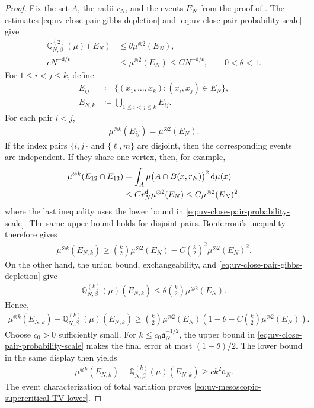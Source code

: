 \documentclass[11pt,reqno]{amsart}
\numberwithin{equation}{section}
\theoremstyle{plain}
\theoremstyle{remark}
\renewcommand{\d}{\mathsf{d}}
\newcommand{\md}{\mathrm{d}}
\newcommand{\Q}{{\mathbb{Q}}}
\newcommand{\be}{\beta}
\newcommand{\s}{\mathsf{s}}
\begin{document}
\begin{proof}
Fix the set \(A\), the radii \(r_N\), and the events \(E_N\) from the proof of .  The estimates \eqref{eq:uv-close-pair-gibbs-depletion} and \eqref{eq:uv-close-pair-probability-scale} give
\begin{align}\label{eq:uv-recalled-close-pair-data}
 \Q_{N,\be}^{(2)}(\mu)(E_N)&\le\theta\mu^{\otimes2}(E_N),
 \\
 cN^{-\d/\s}&\le\mu^{\otimes2}(E_N)\le CN^{-\d/\s},
 \qquad 0<\theta<1.
\end{align}
For \(1\le i<j\le k\), define
\begin{align}
 E_{ij}&\coloneqq
 \bigl\{(x_1,\ldots,x_k):(x_i,x_j)\in E_N\bigr\},
 \label{eq:uv-observed-pair-event}\\
 E_{N,k}&\coloneqq\bigcup_{1\le i<j\le k}E_{ij}.
 \label{eq:uv-observed-close-pair-union}
\end{align}
For each pair \(i<j\),
\begin{align}\label{eq:uv-single-pair-product-probability}
 \mu^{\otimes k}(E_{ij})=\mu^{\otimes2}(E_N).
\end{align}
If the index pairs \(\{i,j\}\) and \(\{\ell,m\}\) are disjoint, then the corresponding events are independent.  If they share one vertex, then, for example,
\begin{align}\label{eq:uv-overlapping-pair-intersection}
 \mu^{\otimes k}(E_{12}\cap E_{13})
 &=\int_A\mu\bigl(A\cap B(x,r_N)\bigr)^2\,\md\mu(x)\notag\\
 &\le Cr_N^\d\mu^{\otimes2}(E_N)
 \le C\mu^{\otimes2}(E_N)^2,
\end{align}
where the last inequality uses the lower bound in \eqref{eq:uv-close-pair-probability-scale}.  The same upper bound holds for disjoint pairs.  Bonferroni's inequality therefore gives
\begin{align}\label{eq:uv-bonferroni}
 \mu^{\otimes k}(E_{N,k})
 \ge\binom{k}{2}\mu^{\otimes2}(E_N)
 -C\binom{k}{2}^{\!2}\mu^{\otimes2}(E_N)^2.
\end{align}
On the other hand, the union bound, exchangeability, and \eqref{eq:uv-close-pair-gibbs-depletion} give
\begin{align}\label{eq:uv-gibbs-union}
 \Q_{N,\be}^{(k)}(\mu)(E_{N,k})
 \le\theta\binom{k}{2}\mu^{\otimes2}(E_N).
\end{align}
Hence,
\begin{align}\label{eq:uv-event-probability-gap}
 \mu^{\otimes k}(E_{N,k})-\Q_{N,\be}^{(k)}(\mu)(E_{N,k})
 \ge\binom{k}{2}\mu^{\otimes2}(E_N)
 \left(1-\theta-C\binom{k}{2}\mu^{\otimes2}(E_N)\right).
\end{align}
Choose \(c_0>0\) sufficiently small.  For \(k\le c_0\mathfrak a_N^{-1/2}\), the upper bound in \eqref{eq:uv-close-pair-probability-scale} makes the final error at most \((1-\theta)/2\).  The lower bound in the same display then yields
\begin{align}\label{eq:uv-event-gap-lower}
 \mu^{\otimes k}(E_{N,k})-\Q_{N,\be}^{(k)}(\mu)(E_{N,k})
 \ge ck^2\mathfrak a_N.
\end{align}
The event characterization of total variation proves \eqref{eq:uv-mesoscopic-supercritical-TV-lower}.
\end{proof}
\end{document}
